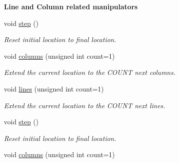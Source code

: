 \begin{Indent}{\bf Line and Column related manipulators}\par
\begin{DoxyCompactItemize}
\item 
\hypertarget{classyy_1_1location_a96620cec8dd8ebfc96c60a03c10154d0}{void \hyperlink{classyy_1_1location_a96620cec8dd8ebfc96c60a03c10154d0}{step} ()}\label{classyy_1_1location_a96620cec8dd8ebfc96c60a03c10154d0}

\begin{DoxyCompactList}\small\item\em Reset initial location to final location. \end{DoxyCompactList}\item 
\hypertarget{classyy_1_1location_a044d2ef2831243279beb5e1b93ffca39}{void \hyperlink{classyy_1_1location_a044d2ef2831243279beb5e1b93ffca39}{columns} (unsigned int count=1)}\label{classyy_1_1location_a044d2ef2831243279beb5e1b93ffca39}

\begin{DoxyCompactList}\small\item\em Extend the current location to the C\-O\-U\-N\-T next columns. \end{DoxyCompactList}\item 
\hypertarget{classyy_1_1location_af05c5d78c5a53fb3aa4ef4e34c9eb723}{void \hyperlink{classyy_1_1location_af05c5d78c5a53fb3aa4ef4e34c9eb723}{lines} (unsigned int count=1)}\label{classyy_1_1location_af05c5d78c5a53fb3aa4ef4e34c9eb723}

\begin{DoxyCompactList}\small\item\em Extend the current location to the C\-O\-U\-N\-T next lines. \end{DoxyCompactList}\item 
\hypertarget{classyy_1_1location_a96620cec8dd8ebfc96c60a03c10154d0}{void \hyperlink{classyy_1_1location_a96620cec8dd8ebfc96c60a03c10154d0}{step} ()}\label{classyy_1_1location_a96620cec8dd8ebfc96c60a03c10154d0}

\begin{DoxyCompactList}\small\item\em Reset initial location to final location. \end{DoxyCompactList}\item 
\hypertarget{classyy_1_1location_a044d2ef2831243279beb5e1b93ffca39}{void \hyperlink{classyy_1_1location_a044d2ef2831243279beb5e1b93ffca39}{columns} (unsigned int count=1)}\label{classyy_1_1location_a044d2ef2831243279beb5e1b93ffca39}


\end{DoxyCompactItemize}
\end{Indent}
